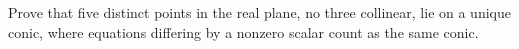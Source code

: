 Prove that five distinct points in the real plane, no three collinear, lie on a unique conic, where equations differing by a nonzero scalar count as the same conic.
